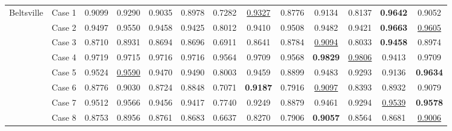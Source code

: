 \begin{table*}[t]
\begin{center}
{\begin{tabular}{cc ccccccccccc}
	            \multirow{8}{*}{Beltsville}
	            & Case 1 & 
	            0.9099 & 0.9290 & 0.9035 & 0.8978 & 0.7282 & \underline{0.9327} & 0.8776 & 0.9134 & 0.8137 & \textbf{0.9642} & 0.9052 \\
	            & Case 2 &
	            0.9497 & 0.9550 & 0.9458 & 0.9425 & 0.8012 & 0.9410 & 0.9508 & 0.9482 & 0.9421 & \textbf{0.9663} & \underline{0.9605} \\
	            & Case 3 & 
	            0.8710 & 0.8931 & 0.8694 & 0.8696 & 0.6911 & 0.8641 & 0.8784 & \underline{0.9094} & 0.8033 & \textbf{0.9458} & 0.8974 \\
	            & Case 4 & 
	            0.9719 & 0.9715 & 0.9716 & 0.9716 & 0.9564 & 0.9709 & 0.9568 & \textbf{0.9829} & \underline{0.9806} & 0.9413 & 0.9709 \\
	            & Case 5 & 
	            0.9524 & \underline{0.9590} & 0.9470 & 0.9490 & 0.8003 & 0.9459 & 0.8899 & 0.9483 & 0.9293 & 0.9136 & \textbf{0.9634} \\
	            & Case 6 & 
	            0.8776 & 0.9030 & 0.8724 & 0.8848 & 0.7071 & \textbf{0.9187} & 0.7916 & \underline{0.9097} & 0.8393 & 0.8932 & 0.9079 \\
	            & Case 7 & 
	            0.9512 & 0.9566 & 0.9456 & 0.9417 & 0.7740 & 0.9249 & 0.8879 & 0.9461 & 0.9294 & \underline{0.9539} & \textbf{0.9578} \\
	            & Case 8 & 
	            0.8753 & 0.8956 & 0.8761 & 0.8683 & 0.6637 & 0.8270 & 0.7906 & \textbf{0.9057} & 0.8564 & 0.8681 & \underline{0.9006} \\
            \bottomrule
        \end{tabular}
        		}
    \end{center}
\end{table*}